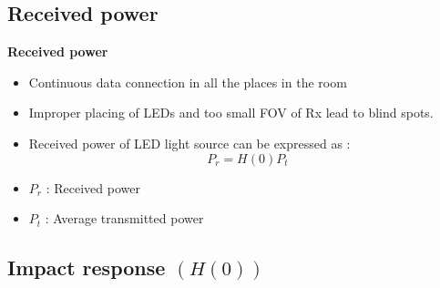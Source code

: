 \documentclass[9pt, dvipsnames]{beamer} %
\begin{document}
\subsection{Received power}
 
   \begin{frame}{\textbf {Received power}}
          
             \begin{itemize}
                \item Continuous data connection in all the places in the room
                \item Improper placing of LEDs and too small FOV of Rx lead to blind spots.
                \item Received power of LED light source can be expressed as :
              \begin{equation}
                  P_r=H(0)P_t
              \end{equation}
              \item $P_r$ : Received power
              \item $P_t$ : Average transmitted power
             \end{itemize}
          
   \end{frame}
   
\subsection{Impact response $(H(0))$}
 
\end{document}
